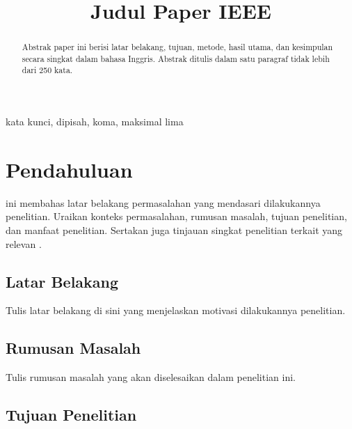 \documentclass[conference]{IEEEtran}
\begin{document}
\title{Judul Paper IEEE}
\author{
}

\maketitle

\begin{abstract}
Abstrak paper ini berisi latar belakang, tujuan, metode, hasil utama, dan kesimpulan secara singkat dalam bahasa Inggris. Abstrak ditulis dalam satu paragraf tidak lebih dari 250 kata.
\end{abstract}

\begin{IEEEkeywords}
kata kunci, dipisah, koma, maksimal lima
\end{IEEEkeywords}

\section{Pendahuluan}
\label{sec:pendahuluan}

 ini membahas latar belakang permasalahan yang mendasari dilakukannya penelitian. Uraikan konteks permasalahan, rumusan masalah, tujuan penelitian, dan manfaat penelitian. Sertakan juga tinjauan singkat penelitian terkait yang relevan \cite{ref1,ref3}.

\subsection{Latar Belakang}
\label{subsec:latar_belakang}

Tulis latar belakang di sini yang menjelaskan motivasi dilakukannya penelitian.

\subsection{Rumusan Masalah}
\label{subsec:rumusan_masalah}

Tulis rumusan masalah yang akan diselesaikan dalam penelitian ini.

\subsection{Tujuan Penelitian}
\label{subsec:tujuan}
\end{document}
